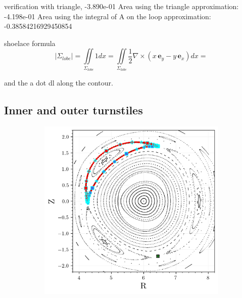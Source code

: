 verification with triangle, 
 -3.890e-01
Area using the triangle approximation: -4.198e-01
Area using the integral of A on the loop approximation: -0.38584216929450854


shoelace formula 
\begin{equation*}
    \vert\Sigma_{lobe}\vert = \iint\limits_{\Sigma_{lobe}}1dx =  \iint\limits_{\Sigma_{lobe}}\frac{1}{2}\nabla\times (x\,\textbf{e}_y - y\,\textbf{e}_x)dx =  
\end{equation*}

and the a dot dl along the contour.

\subsection{Inner and outer turnstiles}

\begin{figure}[h!]
    \centering
    \begin{subfigure}[c]{0.49\textwidth}
        \centering
        \includegraphics[width=\textwidth]{images/high-aspect-ratio/heteroclinics_outer_3.png}
        \caption{}
        \label{fig:}
    \end{subfigure}
    \hfill
    \begin{subfigure}[c]{0.49\textwidth}
        \centering

\end{subfigure}
\end{figure}
